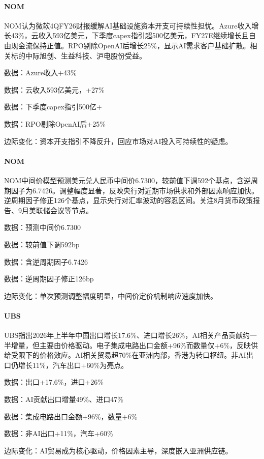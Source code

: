 \documentclass[11pt]{ctexart}
\begin{document}
\paragraph{NOM} NOM认为微软4QFY26财报缓解AI基础设施资本开支可持续性担忧。Azure收入增长43\%，云收入593亿美元，下季度capex指引超500亿美元，FY27E继续增长且自由现金流保持正值。RPO剔除OpenAI后增长25\%，显示AI需求客户基础扩散。相关标的中际旭创、生益科技、沪电股份受益。
{\small\color{refgray}数据：Azure收入+43\%\par}
{\small\color{refgray}数据：云收入593亿美元，+27\%\par}
{\small\color{refgray}数据：下季度capex指引500亿+\par}
{\small\color{refgray}数据：RPO剔除OpenAI后+25\%\par}
{\small\color{refgray}边际变化：资本开支指引不降反升，回应市场对AI投入可持续性的疑虑。\par}
\paragraph{NOM} NOM中间价模型预测美元兑人民币中间价6.7300，较前值下调592个基点，含逆周期因子为6.7426。调整幅度显著，反映央行对近期市场供求和外部因素响应加快。逆周期因子修正126个基点，显示央行对汇率波动的容忍区间。关注8月货币政策报告、9月美联储会议等节点。
{\small\color{refgray}数据：预测中间价6.7300\par}
{\small\color{refgray}数据：较前值下调592bp\par}
{\small\color{refgray}数据：含逆周期因子6.7426\par}
{\small\color{refgray}数据：逆周期因子修正126bp\par}
{\small\color{refgray}边际变化：单次预测调整幅度明显，中间价定价机制响应速度加快。\par}
\paragraph{UBS} UBS指出2026年上半年中国出口增长17.6\%、进口增长26\%，AI相关产品贡献约一半增量，但主要由价格驱动。电子集成电路出口金额+96\%而数量仅+6\%，反映供给受限下的价格效应。AI相关贸易超70\%在亚洲内部，香港为转口枢纽。非AI出口仍增长11\%，汽车出口+60\%为亮点。
{\small\color{refgray}数据：出口+17.6\%，进口+26\%\par}
{\small\color{refgray}数据：AI贡献出口增量49\%、进口47\%\par}
{\small\color{refgray}数据：集成电路出口金额+96\%，数量+6\%\par}
{\small\color{refgray}数据：非AI出口+11\%，汽车+60\%\par}
{\small\color{refgray}边际变化：AI贸易成为核心驱动，价格因素主导，深度嵌入亚洲供应链。\par}
\end{document}
